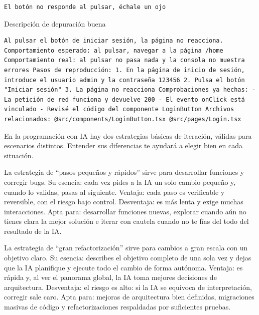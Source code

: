 \begin{lstlisting}
El botón no responde al pulsar, échale un ojo
\end{lstlisting}

Descripción de depuración buena

\begin{lstlisting}
Al pulsar el botón de iniciar sesión, la página no reacciona. Comportamiento esperado: al pulsar, navegar a la página /home Comportamiento real: al pulsar no pasa nada y la consola no muestra errores Pasos de reproducción: 1. En la página de inicio de sesión, introduce el usuario admin y la contraseña 123456 2. Pulsa el botón "Iniciar sesión" 3. La página no reacciona Comprobaciones ya hechas: - La petición de red funciona y devuelve 200 - El evento onClick está vinculado - Revisé el código del componente LoginButton Archivos relacionados: @src/components/LoginButton.tsx @src/pages/Login.tsx
\end{lstlisting}


En la programación con IA hay dos estrategias básicas de iteración, válidas para escenarios distintos. Entender sus diferencias te ayudará a elegir bien en cada situación.

La estrategia de “pasos pequeños y rápidos” sirve para desarrollar funciones y corregir bugs. Su esencia: cada vez pides a la IA un solo cambio pequeño y, cuando lo validas, pasas al siguiente. Ventaja: cada paso es verificable y reversible, con el riesgo bajo control. Desventaja: es más lenta y exige muchas interacciones. Apta para: desarrollar funciones nuevas, explorar cuando aún no tienes clara la mejor solución e iterar con cautela cuando no te fías del todo del resultado de la IA.

La estrategia de “gran refactorización” sirve para cambios a gran escala con un objetivo claro. Su esencia: describes el objetivo completo de una sola vez y dejas que la IA planifique y ejecute todo el cambio de forma autónoma. Ventaja: es rápida y, al ver el panorama global, la IA toma mejores decisiones de arquitectura. Desventaja: el riesgo es alto: si la IA se equivoca de interpretación, corregir sale caro. Apta para: mejoras de arquitectura bien definidas, migraciones masivas de código y refactorizaciones respaldadas por suficientes pruebas.

